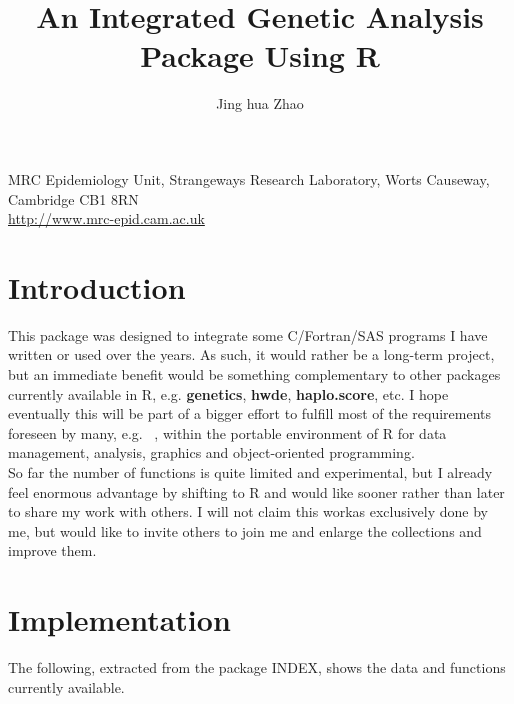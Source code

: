 \documentclass[11pt,a4paper]{article}
\begin{document}
\title{An Integrated Genetic Analysis Package Using R}
\author{Jing hua Zhao}
\date{}
\maketitle

\begin{center}
MRC Epidemiology Unit, Strangeways Research Laboratory, Worts Causeway, Cambridge CB1 8RN\\
\url{http://www.mrc-epid.cam.ac.uk}
\end{center}

\tableofcontents



\section{Introduction}

This package was designed to integrate some C/Fortran/SAS programs I have written 
or used over the years. As such, it would rather be a long-term project, but an
immediate benefit would be something complementary to other packages currently
available in R, e.g. {\bf genetics}, {\bf hwde}, {\bf haplo.score}, etc. I hope
eventually this will be part of a bigger effort to fulfill most of the requirements
foreseen by many, e.g. ~\cite{guo00}, within the portable environment of R
for data management, analysis, graphics and object-oriented programming. \\

So far the number of functions is quite limited and experimental, but I already
feel enormous advantage by shifting to R and would like sooner rather than later
to share my work with others. I will not claim this workas exclusively done by
me, but would like to invite others to join me and enlarge the collections and
improve them.


\section{Implementation}

The following, extracted from the package INDEX, shows the data and functions
currently available.
\end{document}
